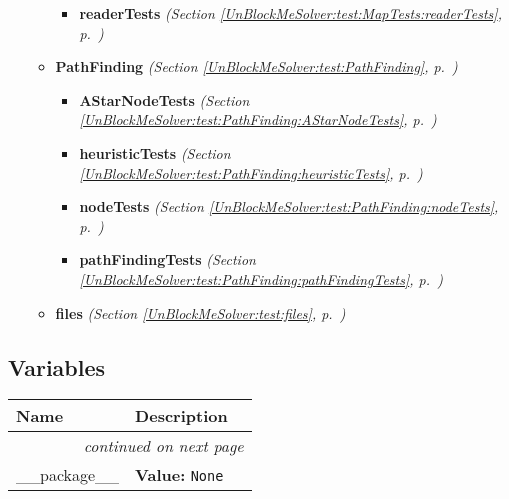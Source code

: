 \begin{itemize}
\begin{itemize}
\begin{itemize}
        \item \textbf{readerTests}
  \textit{(Section \ref{UnBlockMeSolver:test:MapTests:readerTests}, p.~\pageref{UnBlockMeSolver:test:MapTests:readerTests})}

      \end{itemize}
    \item \textbf{PathFinding}
  \textit{(Section \ref{UnBlockMeSolver:test:PathFinding}, p.~\pageref{UnBlockMeSolver:test:PathFinding})}

      \begin{itemize}
    \setlength{\parskip}{0ex}
        \item \textbf{AStarNodeTests}
  \textit{(Section \ref{UnBlockMeSolver:test:PathFinding:AStarNodeTests}, p.~\pageref{UnBlockMeSolver:test:PathFinding:AStarNodeTests})}

        \item \textbf{heuristicTests}
  \textit{(Section \ref{UnBlockMeSolver:test:PathFinding:heuristicTests}, p.~\pageref{UnBlockMeSolver:test:PathFinding:heuristicTests})}

        \item \textbf{nodeTests}
  \textit{(Section \ref{UnBlockMeSolver:test:PathFinding:nodeTests}, p.~\pageref{UnBlockMeSolver:test:PathFinding:nodeTests})}

        \item \textbf{pathFindingTests}
  \textit{(Section \ref{UnBlockMeSolver:test:PathFinding:pathFindingTests}, p.~\pageref{UnBlockMeSolver:test:PathFinding:pathFindingTests})}

      \end{itemize}
    \item \textbf{files}
  \textit{(Section \ref{UnBlockMeSolver:test:files}, p.~\pageref{UnBlockMeSolver:test:files})}

  \end{itemize}
\end{itemize}



  \subsection{Variables}

    \vspace{-1cm}
\hspace{\varindent}\begin{longtable}{|p{\varnamewidth}|p{\vardescrwidth}|l}
\cline{1-2}
\cline{1-2} \centering \textbf{Name} & \centering \textbf{Description}& \\
\cline{1-2}
\endhead\cline{1-2}\multicolumn{3}{r}{\small\textit{continued on next page}}\\\endfoot\cline{1-2}
\endlastfoot\raggedright \_\-\_\-p\-a\-c\-k\-a\-g\-e\-\_\-\_\- & \raggedright \textbf{Value:} 
{\tt None}&\\
\cline{1-2}
\end{longtable}

